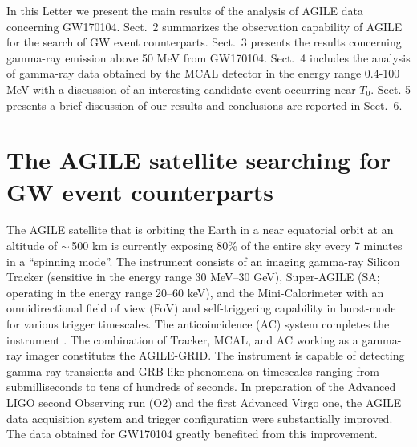 \documentclass[preprint2]{aastex}
\def\gw {GW170104 }
\def\gwp {GW170104}
\def \fv {}
\begin{document}
In this Letter we present the main results of the analysis of AGILE
data concerning \gwp. Sect.~2 summarizes the observation
capability of AGILE for the search of GW event counterparts. Sect.~3
presents the results concerning gamma-ray emission above 50 MeV
from \gwp. Sect.~4 includes the analysis of gamma-ray data
obtained by the MCAL detector in the energy range 0.4-100 MeV with
a discussion of an interesting candidate event occurring near
$T_0$. Sect. 5 presents a brief discussion of our results and
conclusions {\fv are reported in Sect.~6}.




\section{The AGILE satellite searching for GW event counterparts}

The AGILE satellite that is orbiting the Earth in a near
equatorial orbit at an altitude of $\sim$\,500 km
\cite[][]{2009A&A...502..995T} is currently exposing 80\% of the
entire sky every 7 minutes in a ``spinning mode''.
%
 The instrument consists of an imaging gamma-ray Silicon
Tracker (sensitive in the energy range 30 MeV--30 GeV),
Super-AGILE (SA; operating in the energy range 20--60 keV), and the
Mini-Calorimeter \citep[MCAL; working in the range 0.35--100
MeV;][]{2009NIMPA.598..470L,2008A&A...490.1151M,2008NIMPA.588...17F}
with an omnidirectional field of view (FoV) and self-triggering capability
in burst-mode for various trigger timescales. The
anticoincidence (AC) system completes the instrument \cite[for a
summary of the AGILE mission features, see ][]{2009A&A...502..995T}.
The combination of Tracker, MCAL, and AC working as a gamma-ray
imager constitutes the AGILE-GRID. The instrument is capable of
detecting gamma-ray transients and GRB-like phenomena {\fv on}
timescales ranging from submilliseconds to tens of hundreds of
seconds.
 In preparation of the Advanced LIGO second Observing run (O2) and the
first Advanced Virgo one, the AGILE data acquisition system and
trigger configuration were substantially improved. The data
obtained for \gw greatly benefited from this improvement.
%
%
\end{document}

